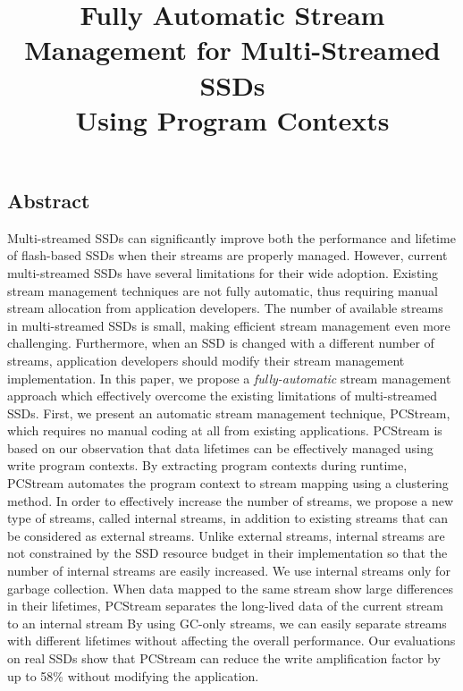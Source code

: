 \documentclass[letterpaper, twocolumn, 10pt]{article}
\begin{document}
\title{
\bf Fully Automatic Stream Management for Multi-Streamed SSDs \\ Using Program Contexts}

%


\maketitle
\pagestyle{empty}
\subsection*{Abstract}
Multi-streamed SSDs
can significantly improve both the performance and lifetime of flash-based SSDs
when their streams are properly managed.  
However, current multi-streamed SSDs have several limitations for their wide adoption.   
Existing stream management techniques are not fully automatic, 
thus requiring manual stream allocation from application developers.  
The number of available streams in multi-streamed SSDs is small, making efficient stream management even more challenging.  
Furthermore, when an SSD is changed with a different number of streams, 
application developers should modify their stream management implementation.
In this paper, we propose a {\it fully-automatic} stream
management approach which effectively overcome the existing limitations of multi-streamed SSDs. 
First, we present  an automatic stream management technique, PCStream, which requires 
no manual coding at all from existing applications.   
PCStream is based on our observation that data lifetimes can be effectively managed
using write program contexts.
By extracting program contexts during runtime, PCStream automates 
the program context to stream mapping using a clustering method.
In order to effectively increase the number of streams, we propose a new type of streams, 
called internal streams, in addition to existing streams that can be considered as external streams.  
Unlike external streams, internal streams are not constrained by the SSD resource budget in 
their implementation so that the number of internal streams are easily increased.   
We use internal streams only for garbage collection.  
When data mapped to the same stream show large differences in their lifetimes, 
PCStream separates the long-lived data of the current stream to an internal stream  
By using GC-only streams, we can easily separate streams with
different lifetimes without affecting the overall performance.    
Our evaluations on real SSDs show that PCStream can reduce the write amplification factor by up to 58\% 
without modifying the application.
\end{document}
